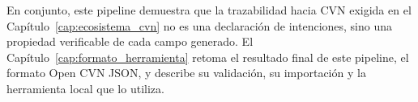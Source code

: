 En conjunto, este pipeline demuestra que la trazabilidad hacia CVN exigida en
el Capítulo~\ref{cap:ecosistema_cvn} no es una declaración de intenciones,
sino una propiedad verificable de cada campo generado. El
Capítulo~\ref{cap:formato_herramienta} retoma el resultado final de este pipeline, el formato Open CVN
JSON, y describe su validación, su importación y la herramienta local que lo
utiliza.
